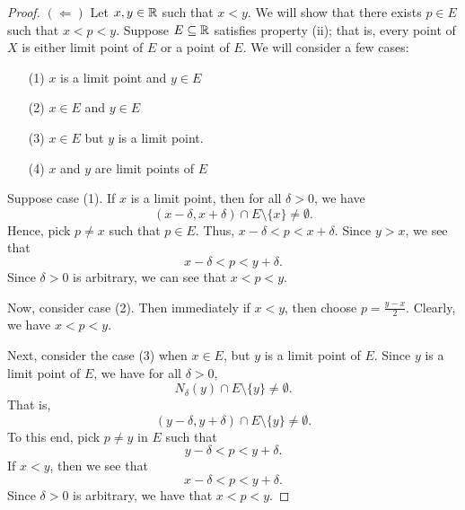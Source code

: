 \documentclass[a4paper]{article}
\begin{document}
\begin{enumerate}
\begin{proof}
    \( (\Longleftarrow ) \) Let \( x,y \in \mathbb{R}  \) such that \( x < y  \). We will show that there exists \( p \in E  \) such that \( x < p < y \). Suppose \( E \subseteq \mathbb{R}   \) satisfies property (ii); that is, every point of \( X  \) is either limit point of \( E  \) or a point of \( E  \). We will consider a few cases:     
    \begin{enumerate}
        \item[(1)] \( x  \) is a limit point and \( y \in E  \)
        \item[(2)] \( x \in E  \) and \( y \in E  \)
        \item[(3)] \( x \in E  \) but \( y  \) is a limit point.
        \item[(4)] \( x  \) and \( y  \) are limit points of \( E  \) 
    \end{enumerate}
    Suppose case (1). If \( x  \) is a limit point, then for all \( \delta > 0  \), we have 
    \[  (x - \delta, x + \delta) \cap E \setminus  \{ x  \}  \neq \emptyset. \]
    Hence, pick \( p \neq x  \) such that \( p \in E  \). Thus, \( x - \delta < p < x + \delta \). Since \( y > x  \), we see that 
    \[  x - \delta < p < y  + \delta. \]
    Since \( \delta> 0  \) is arbitrary, we can see that \( x < p < y  \).

    Now, consider case (2). Then immediately if \( x < y  \), then choose \( p = \frac{  y -x  }{ 2  }  \). Clearly, we have \( x < p < y \).

    Next, consider the case (3) when \( x \in E   \), but \( y  \) is a limit point of \( E  \). Since \( y  \) is a limit point of \( E  \), we have for all \( \delta > 0  \), 
    \[  {N}_{\delta}(y) \cap E \setminus  \{ y \} \neq \emptyset. \]
    That is, 
    \[  (y - \delta, y + \delta)  \cap E \setminus  \{ y \} \neq \emptyset. \]
    To this end, pick \( p \neq y  \) in \( E  \) such that 
    \[  y - \delta < p < y + \delta. \]
    If \( x < y  \), then we see that
    \[  x  - \delta < p < y + \delta. \]
    Since \( \delta > 0  \) is arbitrary, we have that \( x < p < y \).


\end{proof}
\end{enumerate}
\end{document}
